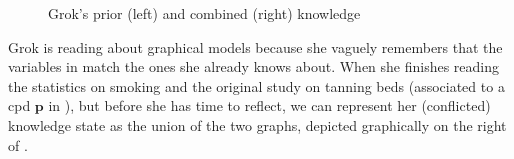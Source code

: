 \documentclass{article}
\newcommand\cmergearr[4]{
		\draw[arr,-] (#1) -- (#4) -- (#2);
		\draw[arr, shorten <=0] (#4) -- (#3);
	}
\newcommand\mergearr[3]{
		\coordinate (center-#1#2#3) at (barycentric cs:#1=1,#2=1,#3=1.2);
		\cmergearr{#1}{#2}{#3}{center-#1#2#3}
	}
\theoremstyle{plain}
\theoremstyle{definition}
\newenvironment{example}
	{\pushQED{\qed}\renewcommand{\qedsymbol}{$\triangle$}\examplex}
	{\popQED\endexamplex%
}
\theoremstyle{remark}
\newcommand\mat[1]{\mathbf{#1}}
\numberwithin{equation}{section}
\begin{document}
\begin{example}
\begin{figure}
{
			}
			
			\caption{\small Grok's prior (left) and combined (right) knowledge}
			\label{fig:grok-combine}
		\end{figure}
		
		Grok is reading about graphical models because she
                vaguely remembers that the variables in
                 match the ones she already knows
                about. When she finishes reading the statistics on
                smoking and the original study on tanning beds
                (associated to a cpd $\mat p$ in ),
                but before she has time to reflect, we can represent
                her (conflicted) knowledge state as the union of the
                two graphs, depicted graphically on the right of
                .  
	 

\end{example}
\end{document}
